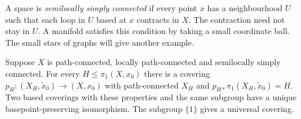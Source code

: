 A space is \emph{semilocally simply connected} if every point $x$ has a neighbourhood $U$ such that each loop in $U$ based at $x$ contracts in $X$. The contraction need not stay in $U$. A manifold satisfies this condition by taking a small coordinate ball. The small stars of graphs will give another example.

\begin{theorem}\label{thm:galois}
Suppose $X$ is path-connected, locally path-connected and semilocally simply connected. For every $H\le\pi_1(X,x_0)$ there is a covering
$p_H:(X_H,\tilde x_0)\to(X,x_0)$ with path-connected $X_H$ and $p_{H*}\pi_1(X_H,\tilde x_0)=H$. Two based coverings with these properties and the same subgroup have a unique basepoint-preserving isomorphism. The subgroup $\{1\}$ gives a universal covering.
\end{theorem}

